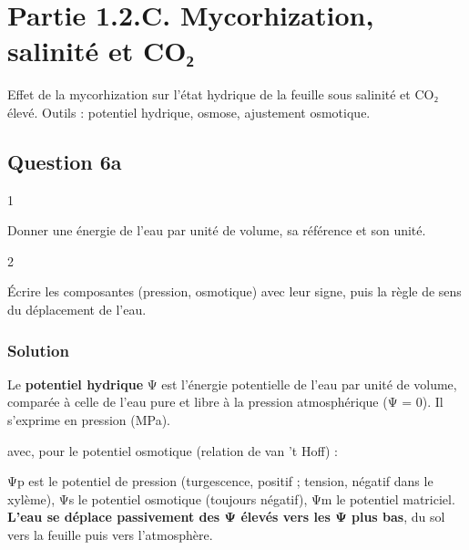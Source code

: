 \documentclass[11pt,a4paper]{article}
\newcommand{\equationajustee}[1]{%
  \sbox{\boiteequation}{$\displaystyle #1$}%
  \ifdim\wd\boiteequation>\linewidth
    \[\resizebox{\linewidth}{!}{\usebox{\boiteequation}}\]%
  \else
    \[#1\]%
  \fi}
\begin{document}
\hypertarget{partie-1.2.c.-mycorhization-salinituxe9-et-coux2082}{%
\section{Partie 1.2.C. Mycorhization, salinité et CO₂}\label{partie-1.2.c.-mycorhization-salinituxe9-et-coux2082}}

Effet de la mycorhization sur l'état hydrique de la feuille sous salinité et CO₂ élevé. Outils : potentiel hydrique, osmose, ajustement osmotique.

\hypertarget{question-6a}{%
\subsection{Question 6a}\label{question-6a}}

\begin{indication}{1}

Donner une énergie de l'eau par unité de volume, sa référence et son unité.

\end{indication}

\begin{indication}{2}

Écrire les composantes (pression, osmotique) avec leur signe, puis la règle de sens du déplacement de l'eau.

\end{indication}

\hypertarget{solution-11}{%
\subsubsection{Solution}\label{solution-11}}

Le \textbf{potentiel hydrique} Ψ est l'énergie potentielle de l'eau par unité de volume, comparée à celle de l'eau pure et libre à la pression atmosphérique (Ψ = 0). Il s'exprime en pression (MPa).

\equationajustee{\Psi=\Psi_p+\Psi_s\ (+\Psi_m)}

avec, pour le potentiel osmotique (relation de van 't Hoff) :

\equationajustee{\Psi_s=-RT\sum_i c_i}

Ψp est le potentiel de pression (turgescence, positif ; tension, négatif dans le xylème), Ψs le potentiel osmotique (toujours négatif), Ψm le potentiel matriciel. \textbf{L'eau se déplace passivement des Ψ élevés vers les Ψ plus bas}, du sol vers la feuille puis vers l'atmosphère.
\end{document}
